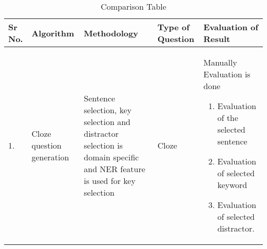 \begin{center}
	\begin{longtable}{| p{0.6cm} | p{2.3cm} | p{4cm} | p{2cm} | p{5cm} |}
		\caption{Comparison Table}\\
		\hline
		{\textbf{Sr No.}} & {\textbf{Algorithm}} & {\textbf{Methodology}} &
		{\textbf{Type of Question}} & {\textbf{Evaluation of Result}}\\[2ex]
		\hline
		1. &
		Cloze question generation &
		Sentence selection, key selection and distractor selection is
		domain specific and NER feature is used for key selection &
		Cloze &
		Manually Evaluation is done
		\begin{enumerate}
		\item Evaluation of the selected sentence
		\item Evaluation of selected keyword 
		\item Evaluation of selected distractor.
		\end{enumerate}
		\\[1ex]
		\hline


\end{longtable}
\end{center}

